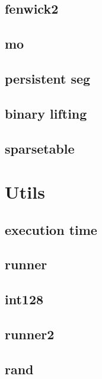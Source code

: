 \subsection{fenwick2}
\raggedbottom
\hrulefill
\subsection{mo}
\raggedbottom
\hrulefill
\subsection{persistent seg}
\raggedbottom
\hrulefill
\subsection{binary lifting}
\raggedbottom
\hrulefill
\subsection{sparsetable}
\raggedbottom
\hrulefill

\section{Utils}
\subsection{execution time}
\raggedbottom
\hrulefill
\subsection{runner}
\raggedbottom
\hrulefill
\subsection{  int128}
\raggedbottom
\hrulefill
\subsection{runner2}
\raggedbottom
\hrulefill
\subsection{rand}
\raggedbottom
\hrulefill

